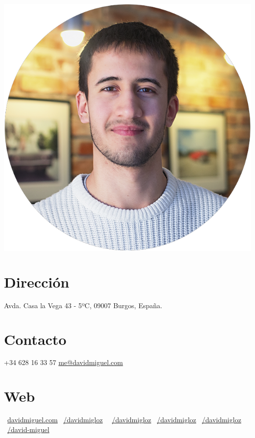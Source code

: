 \documentclass[]{friggeri-cv}
\begin{document}
      

\begin{aside}
  \includegraphics[scale=0.18]{img/profile.png}
  \section{Dirección}
    Avda. Casa la Vega 
    43 - 5ºC, 09007 
    Burgos, España.
    ~
  \section{Contacto}
    +34 628 16 33 57
    \href{mailto:me@davidmiguel.com}{me@davidmiguel.com}
    ~
  \section{Web}
    \faGlobe\ \href{http://davidmiguel.com}{davidmiguel.com}
    \faLinkedin\ \href{https://www.linkedin.com/in/davidmigloz}{/davidmigloz}
    \faFacebook\ \ \href{https://www.facebook.com/DavidMigLoz}{/davidmigloz}
    \faTwitter\ \href{https://twitter.com/DavidMigLoz}{/davidmigloz}
    \faGithub\ \href{https://github.com/davidmigloz/}{/davidmigloz}
    \faStackOverflow\ \href{http://stackoverflow.com/users/6305235/david-miguel}{/david-miguel}
    ~

\end{aside}
\end{document}
